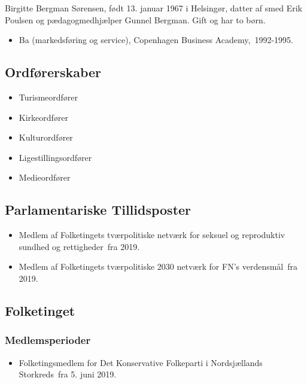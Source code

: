 \documentclass[11pt, a4paper]{awesome-cv}
\begin{document}
\makecvheader[R]
\makelettertitle
\begin{cvletter}
Birgitte Bergman Sørensen, født 13. januar 1967 i Helsingør, datter af smed Erik Poulsen og pædagogmedhjælper Gunnel Bergman. Gift og har to børn. 

\begin{itemize}
\item Ba (markedsføring og service), Copenhagen Business Academy, 1992-1995.
\end{itemize}
\subsection*{Ordførerskaber}
\begin{itemize}
\item Turismeordfører
\item Kirkeordfører
\item Kulturordfører
\item Ligestillingsordfører
\item Medieordfører
\end{itemize}
\subsection*{Parlamentariske Tillidsposter}
\begin{itemize}
\item Medlem af Folketingets tværpolitiske netværk for seksuel og reproduktiv sundhed og rettigheder fra 2019.
\item Medlem af Folketingets tværpolitiske 2030 netværk for FN’s verdensmål fra 2019.
\end{itemize}
\subsection*{Folketinget}
\subsubsection*{Medlemsperioder}
\begin{itemize}
\item Folketingsmedlem for Det Konservative Folkeparti i Nordsjællands Storkreds fra 5. juni 2019.
\end{itemize}

\end{cvletter}
\end{document}
